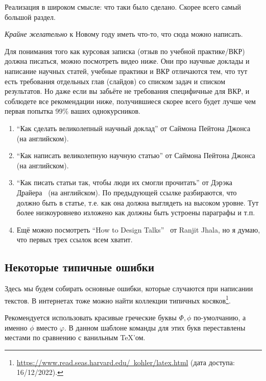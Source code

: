
Реализация в широком смысле: что таки было сделано. Скорее всего самый большой раздел.

\emph{Крайне желательно} к Новому году иметь что-то, что сюда можно написать.

Для понимания того как курсовая записка (отзыв по учебной практике/ВКР) должна писаться, можно посмотреть видео ниже. Они про научные доклады и написание научных статей, учебные практики и ВКР отличаются тем, что тут есть требования отдельных глав (слайдов) со списком задач и списком результатов. Но даже если вы забьёте не требования специфичные для ВКР, и соблюдете все рекомендации ниже, получившиеся скорее всего будет лучше чем первая попытка 99\% ваших однокурсников.

\begin{enumerate}
\item ``Как сделать великолепный научный доклад'' от Саймона Пейтона Джонса~\cite{SPJGreatTalk} (на английском).
\item ``Как написать великолепную научную статью'' от Саймона Пейтона Джонса~\cite{SPJGreatPaper} (на английском).
\item ``Как писать статьи так, чтобы люди их смогли прочитать'' от Дэрэка Драйера~\cite{DreyerYoutube2020} (на английском). По предыдующей ссылке разбираются, что должно быть в статье, т.е. как она должна выглядеть на высоком уровне. Тут более низкоуровнево изложено как должны быть устроены параграфы и т.п.
\item Ещё можно посмотреть ``How to Design Talks''~\cite{JhalaYoutube2020} от Ranjit Jhala, но я думаю, что первых трех ссылок всем хватит.
\end{enumerate}


\subsection{Некоторые типичные ошибки}
Здесь мы будем собирать основные ошибки, которые случаются при написании текстов. В интернетах тоже можно найти коллекции типичных косяков\footnote{\href{https://www.read.seas.harvard.edu/~kohler/latex.html}{https://www.read.seas.harvard.edu/~kohler/latex.html} (дата доступа: 16/12/2022).}.

Рекомендуется использовать красивые греческие буквы $\Phi,\phi$ по-умол\-ча\-нию, а именно $\phi$ вместо $\varphi$. В данном шаблоне команды для этих букв переставлены местами по сравнению с ванильным \TeX'ом.

